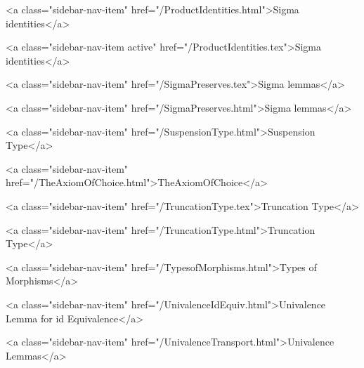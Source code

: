       
    
      
        
          <a class="sidebar-nav-item" href="/ProductIdentities.html">Sigma identities</a>
        
      
    
      
        
          <a class="sidebar-nav-item active" href="/ProductIdentities.tex">Sigma identities</a>
        
      
    
      
        
          <a class="sidebar-nav-item" href="/SigmaPreserves.tex">Sigma lemmas</a>
        
      
    
      
        
          <a class="sidebar-nav-item" href="/SigmaPreserves.html">Sigma lemmas</a>
        
      
    
      
        
          <a class="sidebar-nav-item" href="/SuspensionType.html">Suspension Type</a>
        
      
    
      
        
          <a class="sidebar-nav-item" href="/TheAxiomOfChoice.html">TheAxiomOfChoice</a>
        
      
    
      
        
          <a class="sidebar-nav-item" href="/TruncationType.tex">Truncation Type</a>
        
      
    
      
        
          <a class="sidebar-nav-item" href="/TruncationType.html">Truncation Type</a>
        
      
    
      
        
          <a class="sidebar-nav-item" href="/TypesofMorphisms.html">Types of Morphisms</a>
        
      
    
      
        
          <a class="sidebar-nav-item" href="/UnivalenceIdEquiv.html">Univalence Lemma for id Equivalence</a>
        
      
    
      
        
          <a class="sidebar-nav-item" href="/UnivalenceTransport.html">Univalence Lemmas</a>
        
